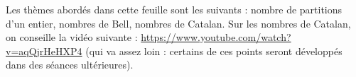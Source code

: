 Les thèmes abordés dans cette feuille sont les suivants : nombre de partitions d'un entier, nombres de Bell, nombres de Catalan. Sur les nombres de Catalan, on conseille la vidéo suivante : \url{https://www.youtube.com/watch?v=aqQjrHeHXP4} (qui va assez loin : certains de ces points seront développés dans des séances ultérieures).\\

